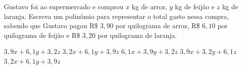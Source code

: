 Gustavo foi ao supermercado e comprou $x$ kg de arroz, $y$ kg de feijão e $z$ kg de laranja. Escreva um polinômio para representar o total gasto nessa compra, sabendo que Gustavo pagou R\$ $3{,}90$ por quilograma de arroz, R\$ $6{,}10$ por quilograma de feijão e R\$ $3{,}20$ por quilograma de laranja.

$3{,}9x+6{,}1y+3{,}2z$
$3{,}2x+6{,}1y+3{,}9z$
$6{,}1x+3{,}9y+3{,}2z$
$3{,}9x+3{,}2y+6{,}1z$
$3{,}2x+6{,}1y+3{,}9z$




